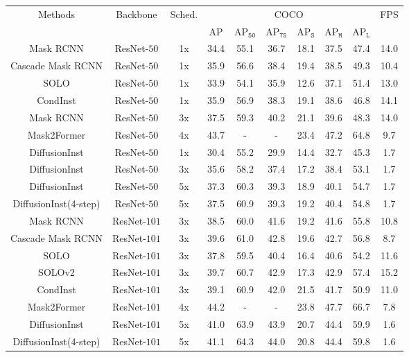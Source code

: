 \documentclass{article}
\begin{document}
\begin{table*}[thb]
\centering
\begin{tabular}{c|c|c|c|cc|ccc|c}
\toprule 
  \multirow{2}{*}{Methods}
  & \multirow{2}{*}{Backbone}
  & \multirow{2}{*}{Sched.}
  & \multicolumn{6}{c|}{COCO}
  & \multirow{2}{*}{FPS} \\
& &
  & AP 
  & AP$_{\mathtt{50}}$ 
  & AP$_{\mathtt{75}}$ 
  & AP$_{\mathtt{S}}$ 
  & AP$_{\mathtt{M}}$
  & AP$_{\mathtt{L}}$
  &\\
\midrule
  Mask RCNN &  ResNet-$50$ &1x &34.4 &55.1&   36.7 &   18.1&  37.5 &47.4& 14.0\\
  Cascade Mask RCNN &  ResNet-$50$ &1x & 35.9  &56.6 & 38.4  & 19.4 & 38.5 &49.3&10.4 \\
  SOLO &  ResNet-$50$ &1x &33.9  & 54.1   &35.9  &12.6   & 37.1   &51.4& 13.0 \\
CondInst &  ResNet-$50$ &1x &35.9  & 56.9&  38.3  &  19.1  & 38.6  & 46.8& 14.1\\
  Mask RCNN &  ResNet-$50$ &3x &37.5& 59.3& 40.2& 21.1& 39.6 &48.3 & 14.0\\
Mask2Former & ResNet-$50$ &4x &43.7  & - & - & 23.4 &47.2 &64.8  &9.7\\
DiffusionInst &  ResNet-$50$ &1x &30.4 &55.2 & 29.9  & 14.4  & 32.7 &45.3& 1.7\\
  DiffusionInst &  ResNet-$50$ &3x &35.6&58.2&37.4&17.2&38.4&53.1&1.7 \\
  DiffusionInst &  ResNet-$50$ &5x & 37.3&60.3&39.3&18.9&40.1&54.7& 1.7\\
  DiffusionInst(4-step) &  ResNet-$50$ &5x & 37.5&60.9&39.3&19.2&40.4&54.8&1.7  \\\midrule
  Mask RCNN &  ResNet-$101$ &3x & 38.5  & 60.0  & 41.6  & 19.2  & 41.6  & 55.8& 10.8\\
  Cascade Mask RCNN &  ResNet-$101$ &3x & 39.6 &  61.0  &42.8  &19.6    &42.7   &56.8&8.7  \\
  SOLO &  ResNet-$101$ &3x &37.8 &59.5  & 40.4  & 16.4   &40.6    & 54.2&11.6 \\
  SOLOv2 &  ResNet-$101$ &3x &39.7  & 60.7   & 42.9  & 17.3  &42.9  & 57.4& 15.2\\
  CondInst &  ResNet-$101$ &3x &39.1  &  60.9 & 42.0  &21.5   & 41.7  & 50.9& 11.0 \\
  Mask2Former & ResNet-$101$ &4x &44.2 &-&-&23.8 &47.7 &66.7 &7.8\\
  DiffusionInst &  ResNet-$101$ &5x & 41.0&63.9&43.9&20.7&44.4&59.9& 1.6\\ 
  DiffusionInst(4-step) &  ResNet-$101$ &5x &41.1&64.3&44.0&20.8&44.4&59.8 &1.6\\ \midrule

\end{tabular}
\end{table*}
\end{document}
